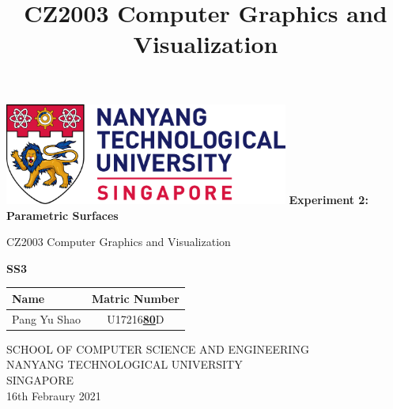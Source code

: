 \documentclass[acmlarge,nonacm=true]{acmart}
\begin{document}
	
	\begin{titlepage}
		\begin{center}
			\vspace*{1cm}
			\includegraphics[width=0.7\textwidth]{fig/ntu_logo}
			\vspace{0.8cm}
			\linebreak
			\Huge
			\textbf{Experiment 2: Parametric Surfaces}
			
			\vspace{0.5cm}
			\LARGE
			CZ2003 Computer Graphics and Visualization
			
			\vspace{1.5cm}
			\textbf{SS3}\\
			
			\begin{table}[h]
				\begin{tabular}{lc}
					Name & Matric Number \\\hline
					Pang Yu Shao & U17216\underline{\textbf{80}}D \\
				\end{tabular}
			\end{table}
			
			
			
			\vfill
			
			\vspace{0.8cm}
			
			
			
			\Large
			SCHOOL OF COMPUTER SCIENCE AND ENGINEERING\\
			NANYANG TECHNOLOGICAL UNIVERSITY\\
			SINGAPORE\\
			16th Febraury 2021
			
		\end{center}
	\end{titlepage}

 

\title{CZ2003 Computer Graphics and Visualization}

\end{document}
